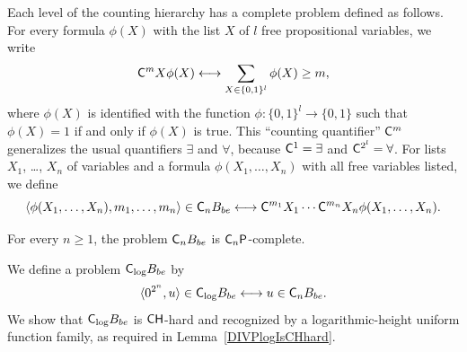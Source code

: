 Each level of the counting hierarchy 
has a complete problem defined as follows.
For every formula $\phi(X)$ with the list $X$ of $l$ free propositional variables,
we write 
\begin{equation}
 \mathsf{C}^m X \phi(X) 
  \longleftrightarrow 
  \sum_{X \in \{0,1\}^l} \phi(X) \ge m,
\end{equation}
where $\phi(X)$ is identified with the function 
$\phi \colon \{0,1\}^l \to \{0,1\}$
such that $\phi(X) = 1$ if and only if $\phi(X)$ is true.
This ``counting quantifier'' $\mathsf{C} ^m$ generalizes 
the usual quantifiers $\exists$ and $\forall$, 
because $\mathsf{C}^1 = \exists$ and $\mathsf{C}^{2^l} = \forall$.
For lists $X _1$, \ldots, $X _n$ of variables 
and a formula $\phi(X_1, \dots, X_n)$ with all free variables listed, 
we define
\begin{equation}
 \langle \phi(X_1, \dots, X_n), m_1, \dots, m_n \rangle \in \mathsf{C}_n B_{be}
 \longleftrightarrow
 \mathsf{C}^{m_1}{X_1} \cdots \mathsf{C}^{m_n}{X_n} \phi(X_1, \dots, X_n).
\end{equation}

\begin{lemma} \label{lemma:CnP-complete}
 For every $n \ge 1$, 
 the problem $\mathsf{C}_n B_{be}$ is $\mathsf{C}_n\mathsf{P}$-complete.
\end{lemma}

We define a problem $\mathsf{C}_{\log} B_{be}$ by
\begin{equation}
 \langle 0^{2^n}, u \rangle \in \mathsf{C}_{\log} B_{be}
 \longleftrightarrow
 u \in \mathsf{C}_n B_{be}.
\end{equation}
We show that $\mathsf{C}_{\log} B_{be}$ 
is $\mathsf{CH}$-hard and recognized by a logarithmic-height uniform function family,
as required in Lemma~\ref{DIVPlogIsCHhard}. 

